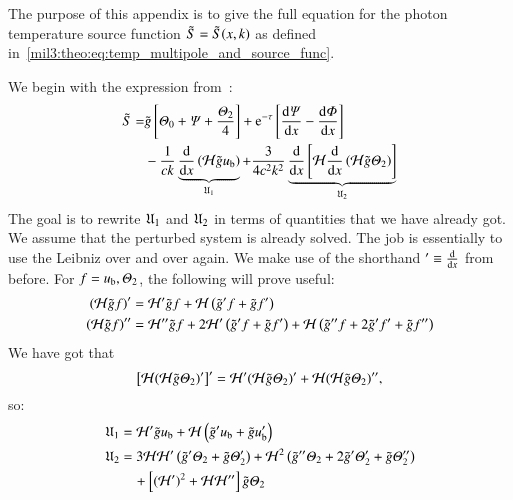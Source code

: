 

The purpose of this appendix is to give the full equation for the photon temperature source function $\tilde{S}=\tilde{S}(x, k)$ as defined in~\cref{mil3:theo:eq:temp_multipole_and_source_func}.

We begin with the expression from~\citet[Eq.~(40)]{Callin2006}:
\begin{equation}\label{app:source:eq:source_function}
\begin{split}
    \tilde{S} =& \gt \left[\Theta_0 + \Psi + \frac{\Theta_2}{4}\right] + \eu[-\tau]\left[ \dv{\Psi}{x} -\dv{\Phi}{x} \right] \\
    &- \frac{1}{ck} \underbrace{\dv{}{x}\left(\Hp \gt u\ped{b} \right)}_{\expr_1}+ \frac{3}{4c^2k^2} \underbrace{\dv{}{x}\left[ \Hp \dv{}{x}\left(\Hp \gt\Theta_2 \right)  \right]}_{\expr_2}
\end{split}
\end{equation}
The goal is to rewrite $\mathfrak{U}_1$ and $\mathfrak{U}_2$ in terms of quantities that we have already got. We assume that the perturbed system is already solved. The job is essentially to use the Leibniz over and over again. We make use of the shorthand $'\equiv \dv{}{x}$ from before. For $f=u_\mathrm{b}, \varTheta_2 $, the following will prove useful:
\begin{subequations}
\begin{align}
    \left(\mathcal{H} \tilde{g} f \right)' &= \mathcal{H}'\tilde{g} f + \mathcal{H} \left( \tilde{g}' f + \tilde{g} f'\right)\\
    \left(\mathcal{H} \tilde{g} f \right)''&= \mathcal{H}'' \tilde{g} f + 2\mathcal{H}' \left(\tilde{g}' f + \tilde{g} f'\right) + \mathcal{H} \left(\tilde{g}'' f + 2\tilde{g}' f' + \tilde{g} f'' \right)
\end{align}
\end{subequations}
We have got that 
\begin{equation}
    \left[\mathcal{H} (\mathcal{H} \tilde{g} \varTheta_2)' \right]' = \mathcal{H}' (\mathcal{H} \tilde{g} \varTheta_2)' + \mathcal{H} (\mathcal{H} \tilde{g} \varTheta_2)'',
\end{equation}
so:
\begin{subequations}\label{app:source:eq:expressions}
\begin{align}
    \mathfrak{U}_1 &= \mathcal{H}'\tilde{g} u_\mathrm{b} + \mathcal{H} \left( \tilde{g}' u_\mathrm{b} + \tilde{g} u_\mathrm{b}'\right) \\
    \mathfrak{U}_2 &= 3\mathcal{H} \mathcal{H}' \left(\tilde{g}' \varTheta_2 + \tilde{g} \varTheta_2'\right) + \mathcal{H}^2\left(\tilde{g}'' \varTheta_2 +2 \tilde{g}' \varTheta_2' + \tilde{g} \varTheta_2''\right) \nonumber \\
    & \quad + \left[(\mathcal{H}')^2 + \mathcal{H} \mathcal{H}''\right]\tilde{g} \varTheta_2 \label{app:source:eq:expr1}
\end{align}
\end{subequations}
